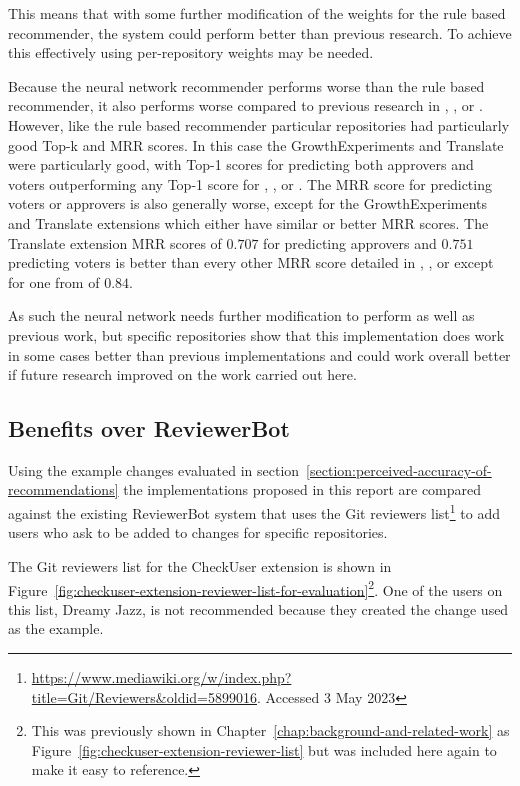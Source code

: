 This means that with some further modification of the weights for the rule based recommender, the system could perform better than previous research. To achieve this effectively using per-repository weights may be needed.

Because the neural network recommender performs worse than the rule based recommender, it also performs worse compared to previous research in \cite{9240650}, \cite{7081824}, or \cite{7332472}. However, like the rule based recommender particular repositories had particularly good Top-k and MRR scores. In this case the GrowthExperiments and Translate were particularly good, with Top-1 scores for predicting both approvers and voters outperforming any Top-1 score for \cite{9240650}, \cite{7081824}, or \cite{7332472}. The MRR score for predicting voters or approvers is also generally worse, except for the GrowthExperiments and Translate extensions which either have similar or better MRR scores. The Translate extension MRR scores of \(0.707\) for predicting approvers and \(0.751\) predicting voters is better than every other MRR score detailed in \cite{9240650}, \cite{7081824}, or \cite{7332472} except for one from \cite{7332472} of \(0.84\).

As such the neural network needs further modification to perform as well as previous work, but specific repositories show that this implementation does work in some cases better than previous implementations and could work overall better if future research improved on the work carried out here.

\subsection{Benefits over ReviewerBot}

Using the example changes evaluated in section~\ref{section:perceived-accuracy-of-recommendations} the implementations proposed in this report are compared against the existing ReviewerBot system that uses the Git reviewers list\footnote{\url{https://www.mediawiki.org/w/index.php?title=Git/Reviewers\&oldid=5899016}. Accessed 3 May 2023} to add users who ask to be added to changes for specific repositories.

The Git reviewers list for the CheckUser extension is shown in Figure~\ref{fig:checkuser-extension-reviewer-list-for-evaluation}\footnote{This was previously shown in Chapter~\ref{chap:background-and-related-work} as Figure~\ref{fig:checkuser-extension-reviewer-list} but was included here again to make it easy to reference.}. One of the users on this list, Dreamy Jazz, is not recommended because they created the change used as the example.

